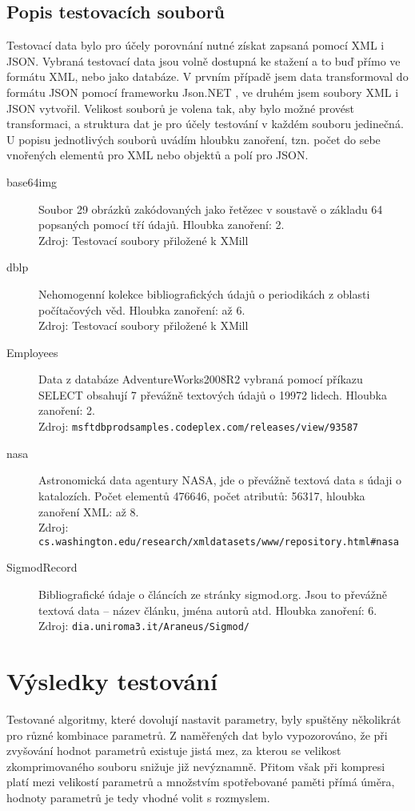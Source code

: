 \subsection{Popis testovacích souborů}
Testovací data bylo pro účely porovnání nutné získat zapsaná pomocí XML i JSON. Vybraná testovací data jsou volně dostupná ke stažení a to buď přímo ve formátu XML, nebo jako databáze. V prvním případě jsem data transformoval do formátu JSON pomocí frameworku Json.NET \cite{jsonNET}, ve druhém jsem soubory XML i JSON vytvořil. Velikost souborů je volena tak, aby bylo možné provést transformaci, a struktura dat je pro účely testování v každém souboru jedinečná. U popisu jednotlivých souborů uvádím hloubku zanoření, tzn. počet do sebe vnořených elementů pro XML nebo objektů a polí pro JSON.

\begin{description}
\item[base64img]Soubor 29 obrázků zakódovaných jako řetězec v soustavě o základu 64 popsaných pomocí tří údajů. Hloubka zanoření: 2.\\
Zdroj: Testovací soubory přiložené k XMill
\item[dblp]
Nehomogenní kolekce bibliografických údajů o periodikách z oblasti počítačových věd. Hloubka zanoření: až 6.\\
Zdroj: Testovací soubory přiložené k XMill
\item[Employees]
Data z databáze AdventureWorks2008R2 vybraná pomocí příkazu SELECT obsahují 7 převážně textových údajů o 19972 lidech. Hloubka zanoření: 2.\\
Zdroj: \texttt{msftdbprodsamples.codeplex.com/releases/view/93587}
\item[nasa]
Astronomická data agentury NASA, jde o převážně textová data s údaji o katalozích. Počet elementů 476646, počet atributů: 56317, hloubka zanoření XML: až 8.\\
Zdroj: \texttt{cs.washington.edu/research/xmldatasets/www/repository.html\#nasa}
\item[SigmodRecord]
Bibliografické údaje o článcích ze stránky sigmod.org. Jsou to převážně textová data -- název článku, jména autorů atd. Hloubka zanoření: 6.\\
Zdroj: \texttt{dia.uniroma3.it/Araneus/Sigmod/}
\end{description}

\section{Výsledky testování}
Testované algoritmy, které dovolují nastavit parametry, byly spuštěny několikrát pro různé kombinace parametrů. Z naměřených dat bylo vypozorováno, že při zvyšování hodnot parametrů existuje jistá mez, za kterou se velikost zkomprimovaného souboru snižuje již nevýznamně. Přitom však při kompresi platí mezi velikostí parametrů a množstvím spotřebované paměti přímá úměra, hodnoty parametrů je tedy vhodné volit s rozmyslem.

